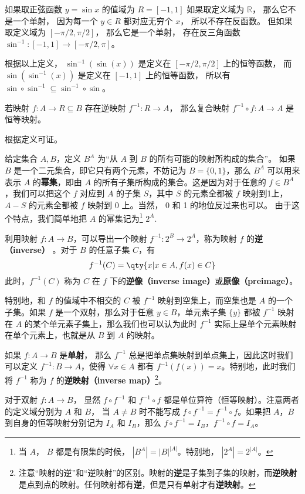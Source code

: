 \begin{example}{}
如果取正弦函数 $y = \sin x$ 的值域为 $R = [-1, 1]$ 如果取定义域为 $\mathbb R$，  那么它不是一个单射， 因为每一个 $y \in R$ 都对应无穷个 $x$， 所以不存在反函数。 但如果取定义域为 $[-\pi/2, \pi/2]$， 那么它是一个单射， 存在反三角函数 $\sin^{-1}: [-1, 1] \to [-\pi/2, \pi]$。

根据以上定义， $\sin^{-1} (\sin(x))$ 是定义在 $[-\pi/2, \pi/2]$ 上的恒等函数， 而 $\sin (\sin^{-1}(x))$ 是定义在 $[-1, 1]$ 上的恒等函数， 所以有 $\sin \circ \sin^{-1} \subseteq \sin^{-1} \circ \sin$。
\end{example}

\begin{corollary}{}
若映射 $f: A  \to R \subseteq B$ 存在逆映射 $f^{-1}: R \to A$， 那么复合映射 $f^{-1} \circ f: A \to A$ 是恒等映射。
\end{corollary}
根据定义可证。


给定集合 $A, B$，定义 $B^A$ 为“从 $A$ 到 $B$ 的所有可能的映射所构成的集合”。 如果 $B$ 是一个二元集合，即它只有两个元素，不妨记为 $B=\{0,1\}$，那么 $B^A$ 可以用来表示 $A$ 的\textbf{幂集}，即由 $A$ 的所有子集所构成的集合。这是因为对于任意的 $f\in B^A$，我们可以把这个 $f$ 对应到 $A$ 的子集 $S$，其中 $S$ 的元素全都被 $f$ 映射到1上， $A-S$ 的元素全都被 $f$ 映射到 0 上。当然， 0 和 1 的地位反过来也可以。 由于这个特点，我们简单地把 $A$ 的幂集记为\footnote{当 $A$， $B$ 都是有限集的时候， $|B^A|=|B|^{|A|}$。特别地， $|2^A|=2^{|A|}$。}  $2^A$. 

利用映射 $f: A \to B$，可以导出一个映射 $f^{-1}:2^B \to 2^A$，称为映射 $f$ 的\textbf{逆（inverse）} 。对于 $B$ 的任意子集 $C$，有
\begin{equation}
f^{-1}(C) = \qty{x | x \in A, f(x) \in C}
\end{equation}
此时，$f^{-1}(C)$ 称为 $C$ 在 $f$ 下的\textbf{逆像（inverse image）}或\textbf{原像（preimage）}。

特别地，和 $f$ 的值域中不相交的 $C$ 被 $f^{-1}$ 映射到空集上，而空集也是 $A$ 的一个子集。如果 $f$ 是一个双射，那么对于任意 $y\in B$，单元素子集 $\{y\}$ 都被 $f^{-1}$ 映射在 $A$ 的某个单元素子集上，那么我们也可以认为此时 $f^{-1}$ 实际上是单个元素映射在单个元素上，也就是从 $B$ 到 $A$ 的映射。

如果 $f: A \to B$ 是\textbf{单射}， 那么 $f^{-1}$ 总是把单点集映射到单点集上，因此这时我们可以定义 $f^{-1}:B\to A$，使得 $\forall x\in A$ 都有 $f^{-1}(f(x))=x$。特别地，此时我们将 $f^{-1}$ 称为 $f$ 的\textbf{逆映射（inverse map）}\footnote{注意“映射的逆”和“逆映射”的区别。映射的\textbf{逆}是子集到子集的映射，而\textbf{逆映射}是点到点的映射。任何映射都有\textbf{逆}，但是只有单射才有\textbf{逆映射}。}。

对于双射 $f: A \to B$， 显然 $f\circ f^{-1}$ 和 $f^{-1}\circ f$ 都是单位算符（恒等映射）。注意两者的定义域分别为 $A$ 和 $B$， 当 $A \ne B$ 时不能写成 $f\circ f^{-1} = f^{-1}\circ f$。如果把 $A$，$B$ 到自身的恒等映射分别记为 $I_A$ 和 $I_B$，那么 $f\circ f^{-1}=I_B$，$f^{-1}\circ f=I_A$。

